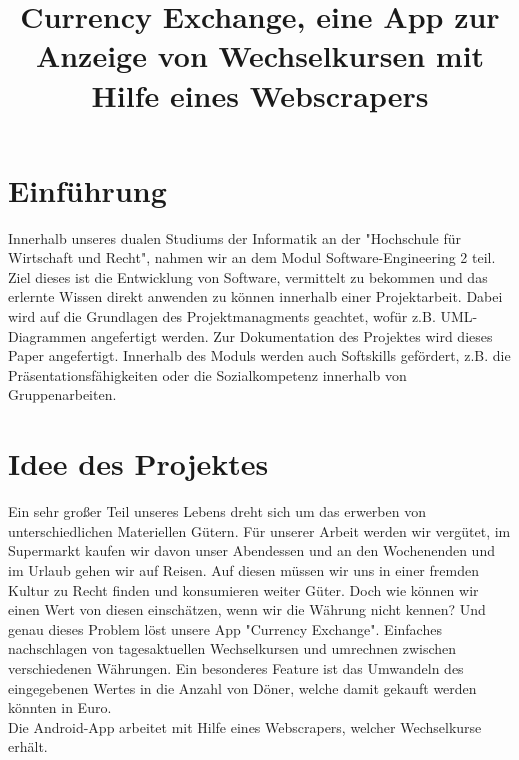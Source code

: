 \documentclass[conference]{IEEEtran}
\begin{document}
\title{Currency Exchange, eine App zur Anzeige von Wechselkursen mit Hilfe eines Webscrapers}


\author{
\and
{}
\and
{}
}

\maketitle


\section{Einführung}
Innerhalb unseres dualen Studiums der Informatik an der "Hochschule für Wirtschaft und Recht", nahmen wir an dem Modul Software-Engineering 2 teil. Ziel dieses ist die Entwicklung von Software, vermittelt zu bekommen und das erlernte Wissen direkt anwenden zu können innerhalb einer Projektarbeit. Dabei wird auf die Grundlagen des Projektmanagments geachtet, wofür z.B. UML-Diagrammen angefertigt werden. Zur Dokumentation des Projektes wird dieses Paper angefertigt. 
Innerhalb des Moduls werden auch Softskills gefördert, z.B. die Präsentationsfähigkeiten oder die Sozialkompetenz innerhalb von Gruppenarbeiten.

\section{Idee des Projektes}
Ein sehr großer Teil unseres Lebens dreht sich um das erwerben von unterschiedlichen Materiellen Gütern. Für unserer Arbeit werden wir vergütet, im Supermarkt kaufen wir davon unser Abendessen und an den Wochenenden und im Urlaub gehen wir auf Reisen. Auf diesen müssen wir uns in einer fremden Kultur zu Recht finden und konsumieren weiter Güter. Doch wie können wir einen Wert von diesen einschätzen, wenn wir die Währung nicht kennen? Und genau dieses Problem löst unsere App "Currency Exchange". Einfaches nachschlagen von tagesaktuellen Wechselkursen und umrechnen zwischen verschiedenen Währungen. Ein besonderes Feature ist das Umwandeln des eingegebenen Wertes in die Anzahl von Döner, welche damit gekauft werden könnten in Euro. \\
Die  Android-App arbeitet mit Hilfe eines Webscrapers, welcher Wechselkurse erhält.
\end{document}
